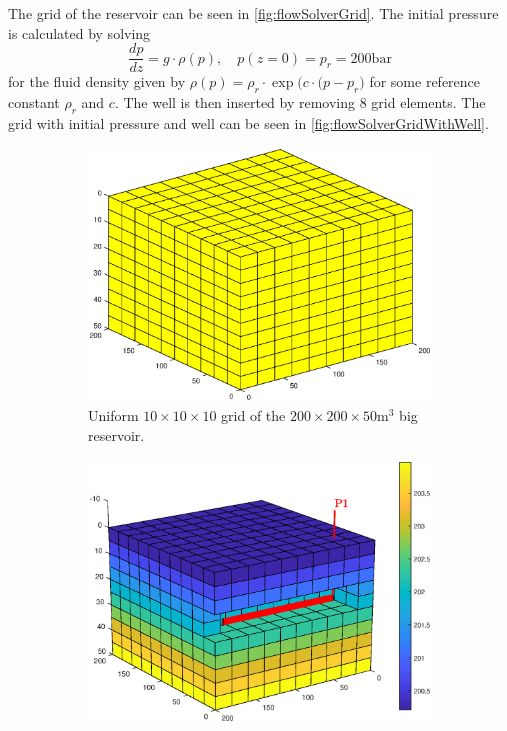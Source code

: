The grid of the reservoir can be seen in \autoref{fig:flowSolverGrid}. The initial pressure is calculated by solving
\begin{equation*}
    \frac{dp}{dz} = g\cdot \rho(p), \quad p(z = 0) = p_r = 200\text{bar} 
\end{equation*}
for the fluid density given by $\rho(p) = \rho_r\cdot\exp\big(c\cdot(p-p_r\big)$ for some reference constant $\rho_r$ and $c$. The well is then inserted by removing 8 grid elements. The grid with initial pressure and well can be seen in \autoref{fig:flowSolverGridWithWell}.
\begin{figure}[htbp]
    \centering
    \begin{subfigure}[t]{0.48\textwidth}
        \centering
        \includegraphics[width = \textwidth]{figures/flowSolver_grid.eps}
        \caption{Uniform $10\times 10 \times 10$ grid of the $200\times 200 \times 50 \text{m}^3$ big reservoir.}
        \label{fig:flowSolverGrid}
    \end{subfigure}
    \begin{subfigure}[t]{0.49\textwidth}
        \centering
        \includegraphics[width = \textwidth]{figures/flowSolver_gridWithWell.eps}

\end{subfigure}
\end{figure}
